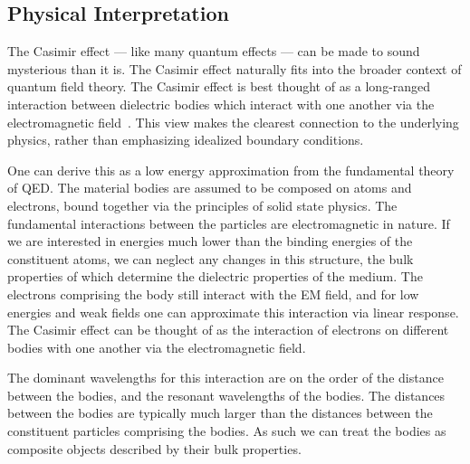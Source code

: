 

\subsection{Physical Interpretation}


The Casimir effect --- like many quantum effects --- can be made to sound mysterious than it is.
The Casimir effect naturally fits into the broader context of quantum field theory.  
The Casimir effect is best thought of as a long-ranged interaction between dielectric bodies 
which interact with one another via the electromagnetic field~\cite{Jaffe2005, Rahi2009}.  
This view makes the clearest connection to the underlying physics, rather than emphasizing idealized
boundary conditions.  

One can derive this as a low energy approximation from the fundamental theory of QED.  
The material bodies are assumed to be composed on atoms and electrons, bound together via
the principles of solid state physics.  The fundamental interactions between the particles 
are electromagnetic in nature.  If we are interested in energies much lower than the binding energies
of the constituent atoms, we can neglect any changes in this structure, the bulk properties of which determine
the dielectric properties of the medium.  
The electrons comprising the body still interact with the EM field, and for low energies and weak fields
one can approximate this interaction via linear response.  
The Casimir effect can be thought of as the interaction of electrons on different bodies with one another
via the electromagnetic field.  

The dominant wavelengths for this interaction are on the order of the distance between the bodies,
and the resonant wavelengths of the bodies.  The distances between the bodies are typically much
larger than the distances between the constituent particles comprising the bodies.  As such we can treat
the bodies as composite objects described by their bulk properties.    


